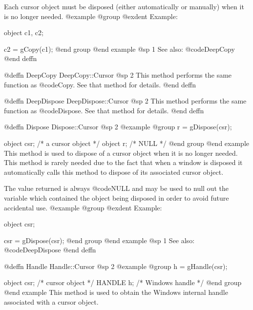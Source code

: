 Each cursor object must be disposed (either automatically or manually)
when it is no longer needed.
@example
@group
@exdent Example:

object  c1, c2;

c2 = gCopy(c1);
@end group
@end example
@sp 1
See also:  @code{DeepCopy}
@end deffn










@deffn {DeepCopy} DeepCopy::Cursor
@sp 2
This method performs the same function as @code{Copy}.  See that
method for details.
@end deffn










@deffn {DeepDispose} DeepDispose::Cursor
@sp 2
This method performs the same function as @code{Dispose}.  See that
method for details.
@end deffn







@deffn {Dispose} Dispose::Cursor
@sp 2
@example
@group
r = gDispose(csr);

object  csr;   /*  a cursor object    */
object  r;     /*  NULL               */
@end group
@end example
This method is used to dispose of a cursor object when it
is no longer needed.  This method is rarely needed due to the fact that
when a window is disposed it automatically calls this method to
dispose of its associated cursor object.

The value returned is always @code{NULL} and may be used to null out
the variable which contained the object being disposed in order to
avoid future accidental use.
@example
@group
@exdent Example:

object  csr;

csr = gDispose(csr);
@end group
@end example
@sp 1
See also:  @code{DeepDispose}
@end deffn










@deffn {Handle} Handle::Cursor
@sp 2
@example
@group
h = gHandle(csr);

object  csr;    /*  cursor object   */
HANDLE  h;      /*  Windows handle  */
@end group
@end example
This method is used to obtain the Windows internal handle associated with
a cursor object.  

